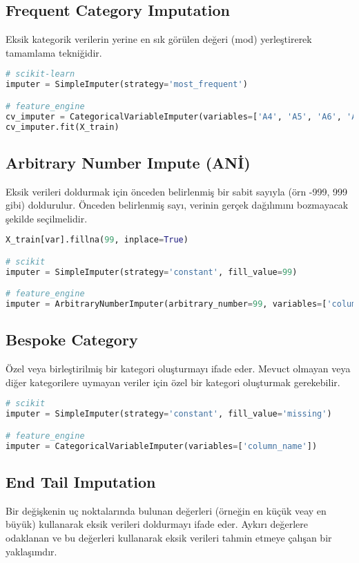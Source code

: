 \subsection{Frequent Category Imputation}
Eksik kategorik verilerin yerine en sık görülen değeri (mod) yerleştirerek tamamlama tekniğidir.

\begin{lstlisting}[language=Python]
# scikit-learn
imputer = SimpleImputer(strategy='most_frequent')

# feature_engine
cv_imputer = CategoricalVariableImputer(variables=['A4', 'A5', 'A6', 'A7'], imputation_method='frequent')
cv_imputer.fit(X_train)
\end{lstlisting}

\subsection{Arbitrary Number Impute (ANİ)}
Eksik verileri doldurmak için önceden belirlenmiş bir sabit sayıyla (örn -999, 999 gibi) doldurulur. Önceden belirlenmiş sayı, verinin gerçek dağılımını bozmayacak şekilde seçilmelidir.

\begin{lstlisting}[language=Python]
X_train[var].fillna(99, inplace=True)

# scikit
imputer = SimpleImputer(strategy='constant', fill_value=99)

# feature_engine
imputer = ArbitraryNumberImputer(arbitrary_number=99, variables=['column_name'])
\end{lstlisting}

\subsection{Bespoke Category}
Özel veya birleştirilmiş bir kategori oluşturmayı ifade eder. Mevuct olmayan veya diğer kategorilere uymayan veriler için özel bir kategori oluşturmak gerekebilir.

\begin{lstlisting}[language=Python]
# scikit
imputer = SimpleImputer(strategy='constant', fill_value='missing')

# feature_engine
imputer = CategoricalVariableImputer(variables=['column_name'])
\end{lstlisting}

\subsection{End Tail Imputation}
Bir değişkenin uç noktalarında bulunan değerleri (örneğin en küçük veay en büyük) kullanarak eksik verileri doldurmayı ifade eder. Aykırı değerlere odaklanan ve bu değerleri kullanarak eksik verileri tahmin etmeye çalışan bir yaklaşımdır.

